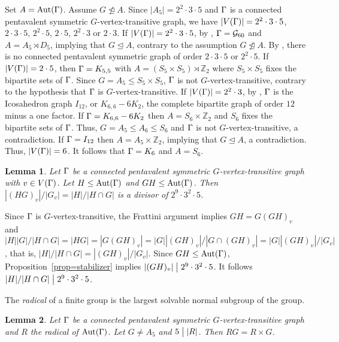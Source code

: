 \documentclass[12pt]{article}
\newtheorem{lem}{Lemma}[section]%
\def\di{\bigm|} \def\lg{\langle} \def\rg{\rangle}
\def\f{\noindent}
\def\Aut{\hbox{\rm Aut}}
\newcommand{\qed}{\mbox{\raisebox{0.7ex}{\fbox{}}} \vspace{4truemm}}
\def\mz{{\mathbb Z}}
\begin{document}
\f {\bf Proof:} Set $A=\Aut(\G)$. Assume $G\ntrianglelefteq  A$. Since $|A_5|=2^2 \cdot 3\cdot 5$
and $\Gamma$ is a connected pentavalent symmetric $G$-vertex-transitive graph, we have $
|V(\Gamma)|=2^2 \cdot3 \cdot5$, $2 \cdot3 \cdot5$, $2^2 \cdot5$, $2 \cdot5 $, $2^2 \cdot3$ or $2 \cdot3$.
If $|V(\Gamma)|=2^2 \cdot 3\cdot 5$, by \cite[Theorem 4.1]{Guo12p}, $\Gamma=\mathcal{G}_{60}$ and $A=A_5 \rtimes D_5$,
implying that $G\unlhd A$, contrary to the assumption $G\ntrianglelefteq  A$. By \cite[Theorems~4.1 and 4.2]{hua},
there is no connected pentavalent symmetric graph of order $2\cdot 3\cdot 5$ or $2^2 \cdot 5$.
If $|V(\Gamma)|=2\cdot 5$, then $\Gamma=K_{5,5}$ with $A=(S_5 \times S_5)\rtimes \mz_2$ where
$S_5\times S_5$ fixes the bipartite sets of $\Gamma$. Since $G=A_5\leq S_5\times S_5$,
$\Gamma$ is not $G$-vertex-transitive, contrary to the hypothesis that $\Gamma$ is $G$-vertex-transitive.
If $|V(\Gamma)|=2^2 \cdot 3$, by \cite[Theorem 4.1]{hua}, $\Gamma$ is the Icosahedron graph $I_{12}$,
or $K_{6,6}-6K_2$, the complete bipartite graph of order $12$ minus a one factor.
If $\Gamma=K_{6,6}-6K_2$ then $A=S_6\times \mz_2$ and $S_6$ fixes the bipartite sets of $\Gamma$.
Thus, $G=A_5\leq A_6\leq S_6$ and $\Gamma$ is not $G$-vertex-transitive, a contradiction.
If $\Gamma=I_{12}$ then $A=A_5 \times \mz_2$, implying that $G\unlhd A$, a contradiction.
Thus, $|V(\Gamma)|=6$. It follows that $\Gamma=K_6$ and $A= S_6$.
\hfill\qed

\begin{lem}\label{lem=GH}
Let $\Gamma$ be a connected pentavalent symmetric $G$-vertex-transitive graph with $v\in V(\Gamma)$. Let $H\leq \Aut(\G)$ and $GH\leq \Aut(\G)$.
Then $|(HG)_v|/|G_v|=|H|/|H\cap G|$ is a divisor of $2^9\cdot 3^2\cdot5$.
\end{lem}

\f {\bf Proof:} Since $\Gamma$ is $G$-vertex-transitive, the Frattini argument implies $GH=G(GH)_v$ and
$|H||G|/|H \cap G|=|HG|=|G(GH)_v|=|G||(GH)_v|/|G\cap (GH)_v|=|G||(GH)_v|/|G_v|$,
that is, $|H|/|H\cap G|=|(GH)_v|/|G_v|$. Since $GH\leq \Aut(\G)$,  Proposition~\ref{prop=stabilizer} implies
$|(GH)_v|\di 2^9\cdot 3^2\cdot5$. It follows $|H|/|H\cap G|\di 2^9\cdot 3^2\cdot 5$.
\hfill\qed

The {\em radical} of a finite group is the largest solvable normal subgroup of the group.

\begin{lem}\label{lem=RG}
Let $\Gamma$ be a connected pentavalent symmetric $G$-vertex-transitive graph and $R$ the radical of $\Aut(\G)$. Let $G\neq A_5$ and $5\di |R|$. Then $RG=R\times G$.
\end{lem}
\end{document}
